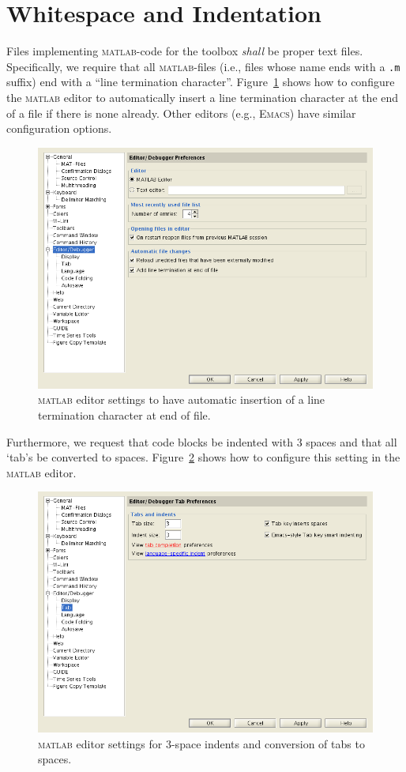 \documentclass[11pt,twoside,UKenglish]{scrartcl}
\newcommand{\matlab}  {\textsc{matlab}}
\newcommand{\Emacs}   {\textsc{Emacs}}
\begin{document}
\section{Whitespace and Indentation}
Files implementing \matlab-code for the toolbox \textsl{shall} be proper
text files.  Specifically, we require that all \matlab-files (i.e.,
files whose name ends with a \texttt{.m} suffix) end with a ``line
termination character''.  Figure~\ref{fig:pref-eofnl} shows how to
configure the {\matlab} editor to automatically insert a line
termination character at the end of a file if there is none already.
Other editors (e.g., {\Emacs}) have similar configuration options.
\begin{figure}[htbp]
  \centering
  \includegraphics[width=115mm]{gfx/pref-eofnl}
  \caption{{\matlab} editor settings to have automatic insertion of a
           line termination character at end of file.}
  \label{fig:pref-eofnl}
\end{figure}
Furthermore, we request that code blocks be indented with $3$ spaces and
that all `tab's be converted to spaces.
Figure~\ref{fig:pref-tab} shows how to configure this setting in the
{\matlab} editor.
\begin{figure}[htbp]
  \centering
  \includegraphics[width=115mm]{gfx/pref-tab}
  \caption{{\matlab} editor settings for $3$-space indents and
           conversion of tabs to spaces.}
  \label{fig:pref-tab}
\end{figure}
\end{document}
